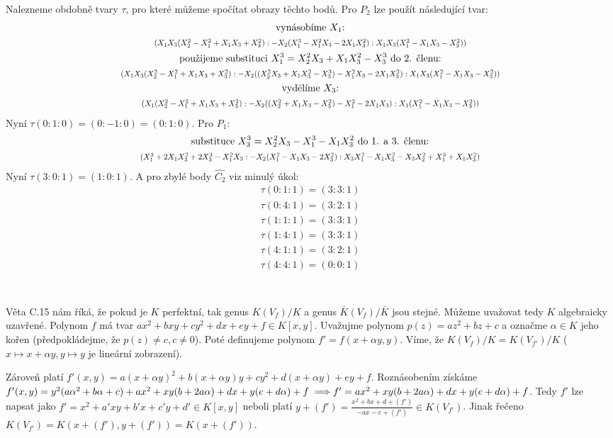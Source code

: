 \documentclass[12pt, a4paper]{article}
\begin{document}
\begin{enumerate}
    Nalezneme obdobně tvary $\tau$, pro které můžeme spočítat obrazy těchto bodů. Pro $P_2$ lze použít následující tvar:
    \begin{gather*}
    \text{vynásobíme $X_1$:}\\
    \scalebox{.8}{$(X_1X_3(X_2^2-X_1^2+X_1X_3+X_3^2) : -X_2(X_1^3-X_1^2X_3-2X_1X_3^2) : X_1X_3(X_1^2-X_1X_3-X_3^2))$}\\
    \text{použijeme substituci $X_1^3 = X_2^2X_3 + X_1X_3^2-X_3^3$ do 2. členu:}\\
    \scalebox{.8}{$(X_1X_3(X_2^2-X_1^2+X_1X_3+X_3^2) : -X_2((X_2^2X_3 + X_1X_3^2-X_3^3)-X_1^2X_3-2X_1X_3^2) : X_1X_3(X_1^2-X_1X_3-X_3^2))$}\\
    \text{vydělíme $X_3$:}\\
    \scalebox{.8}{$(X_1(X_2^2-X_1^2+X_1X_3+X_3^2) : -X_2((X_2^2 + X_1X_3-X_3^2)-X_1^2-2X_1X_3) : X_1(X_1^2-X_1X_3-X_3^2))$}\\
    \end{gather*}
    Nyní $\tau(0:1:0) = (0:-1:0) = (0:1:0)$. Pro $P_1:$
    \begin{gather*}
    \text{substituce $X_3^3 = X_2^2X_3-X_1^3-X_1X_3^2$ do 1. a 3. členu:}\\
    \scalebox{.8}{$(X_1^3+2X_1X_3^2+2X_3^3-X_1^2X_3 : -X_2(X_1^2-X_1X_3-2X_3^2) : X_3X_1^2-X_1X_3^2-X_3X_2^2+X_1^3+X_1X_3^2)$}\\
    \end{gather*}
    Nyní $\tau(3:0:1) = (1:0:1)$. 
    A pro zbylé body $\hat{C_2}$ viz minulý úkol:
    \begin{gather*}
        \tau(0:1:1) = (3:3:1)\\
        \tau(0:4:1) = (3:2:1)\\
        \tau(1:1:1) = (3:3:1)\\
        \tau(1:4:1) = (3:3:1)\\
        \tau(4:1:1) = (3:2:1)\\
        \tau(4:4:1) = (0:0:1)\\
    \end{gather*}
\end{enumerate}

\section{}
Věta C.15 nám říká, že pokud je $K$ perfektní, tak genus $K(V_f)/K$ a genus $\bar{K}(V_f)/\bar{K}$ jsou stejné. Můžeme uvažovat tedy $K$ algebraicky uzavřené. Polynom $f$ má tvar $ax^2+bxy+cy^2+dx+ey+f \in K[x,y]$. Uvažujme polynom $p(z)=az^2+bz+c$ a označme $\alpha \in K$ jeho kořen (předpokládejme, že $p(z) \neq c, c \neq 0$). Poté definujeme polynom $f' = f(x+\alpha y, y)$. Víme, že $K(V_f)/K = K(V_{f'})/K$ ($x \mapsto x+\alpha y, y \mapsto y$ je lineární zobrazení).

Zároveň platí $f'(x,y) = a(x+\alpha y)^2 + b(x+\alpha y)y + cy^2 + d(x+\alpha y) + ey + f$. Roznásobením získáme $f'(x,y) = y^2(a \alpha^2 + b \alpha + c) + ax^2 + xy(b+2a\alpha) + dx + y(e+d\alpha)+f \implies\\f' = ax^2 + xy(b+2a\alpha) + dx + y(e+d\alpha)+f$. Tedy $f'$ lze napsat jako $f'= x^2+a'xy+b'x+c'y+d' \in K[x,y]$ neboli platí $y+(f') = \frac{x^2+bx+d+(f')}{-ax-c+(f')} \in K(V_{f'})$. Jinak řečeno $K(V_{f'}) = K(x+(f'),y+(f'))=K(x+(f'))$. 
\end{document}
